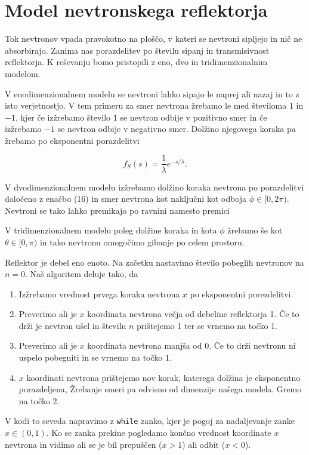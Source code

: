 \documentclass[slovene,11pt,a4paper]{article}
\begin{document}
\section{Model nevtronskega reflektorja}

Tok nevtronov vpada pravokotno na ploščo, v kateri se nevtroni sipljejo in nič ne absorbirajo. Zanima nas porazdelitev po številu sipanj in transmisivnost reflektorja. K reševanju bomo pristopili z eno, dvo in tridimenzionalnim modelom.

V enodimenzionalnem modelu se nevtroni lahko sipajo le naprej ali nazaj in to z isto verjetnostjo. V tem primeru za smer nevtrona žrebamo le med številoma $1$ in $-1$, kjer če izžrebamo število $1$ se nevtron odbije v pozitivno smer in če izžrebamo $-1$ se nevtron odbije v negativno smer. Dolžino njegovega koraka pa žrebamo po eksponentni porazdelitvi

\begin{equation}
f_S(s) = \frac{1}{\lambda} e^{-s/\lambda}.
\end{equation}

V dvodimenzionalnem modelu izžrebamo dolžino koraka nevtrona po porazdelitvi določeno z enačbo (16) in smer nevtrona kot naključni kot odboja $\phi \in [0, 2\pi)$. Nevtroni se tako lahko premikajo po ravnini namesto premici

V tridimenzionalnem modelu poleg dolžine koraka in kota $\phi$ žrebamo še kot $\theta \in [0, \pi)$ in tako nevtronu omogočimo gibanje po celem prostoru.

Reflektor je debel eno enoto. Na začetku nastavimo število pobeglih nevtronov na $n=0$. Naš algoritem deluje tako, da

\begin{enumerate}
\item Izžrebamo vrednost prvega koraka nevtrona $x$ po eksponentni porezdelitvi.
\item Preverimo ali je $x$ koordinata nevtrona večja od debeline reflektorja 1. Če to drži je nevtron ušel in številu $n$ prištejemo 1 ter se vrnemo na točko 1.
\item Preverimo ali je $x$ koordinata nevtrona manjša od 0. Če to drži nevtronu ni uspelo pobegniti in se vrnemo na točko 1.
\item $x$ koordinati nevtrona prištejemo nov korak, katerega dolžina je eksponentno porazdeljena, Žrebanje smeri pa odvisno od dimenzije našega modela. Gremo na točko 2.
\end{enumerate} 
V kodi to seveda napravimo z \texttt{while} zanko, kjer je pogoj za nadaljevanje zanke $x \in (0,1)$. Ko se zanka prekine pogledamo končno vrednost koordinate $x$ nevtrona in vidimo ali se je bil prepuščen ($x>1$) ali odbit ($x<0$).
\end{document}
